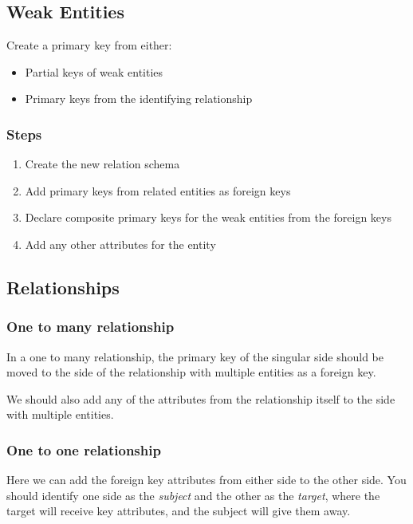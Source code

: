 \subsection{Weak Entities}\label{sub:weak_entities}

Create a primary key from either:
\begin{itemize}
    \item Partial keys of weak entities
    \item Primary keys from the identifying relationship
\end{itemize}

\subsubsection{Steps}\label{ssub:steps}

\begin{enumerate}
    \item Create the new relation schema
    \item Add primary keys from related entities as foreign keys
    \item Declare composite primary keys for the weak entities from the foreign keys
    \item Add any other attributes for the entity
\end{enumerate}

\subsection{Relationships}\label{sub:relationships}

\subsubsection{One to many relationship}\label{ssub:one_to_many_relationship}

In a one to many relationship, the primary key of the singular side should be moved to the side of the relationship with multiple entities as a foreign key.

We should also add any of the attributes from the relationship itself to the side with multiple entities.

\subsubsection{One to one relationship}\label{ssub:one_to_one_relationship}

Here we can add the foreign key attributes from either side to the other side.
You should identify one side as the \emph{subject} and the other as the \emph{target}, where the target will receive key attributes, and the subject will give them away.

